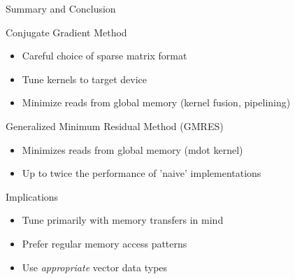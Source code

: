 %
%
\begin{frame}{Summary and Conclusion}

  \begin{block}{Conjugate Gradient Method}
   \begin{itemize}
    \item Careful choice of sparse matrix format
    \item Tune kernels to target device
    \item Minimize reads from global memory (kernel fusion, pipelining)
   \end{itemize}
  \end{block}

  \begin{block}{Generalized Minimum Residual Method (GMRES)}
   \begin{itemize}
    \item Minimizes reads from global memory (mdot kernel)
    \item Up to twice the performance of 'naive' implementations
   \end{itemize}
  \end{block}
  
  \begin{block}{Implications}
    \begin{itemize}
     \item Tune primarily with memory transfers in mind
     \item Prefer regular memory access patterns
     \item Use \emph{appropriate} vector data types
    \end{itemize}
  \end{block}

\end{frame}


